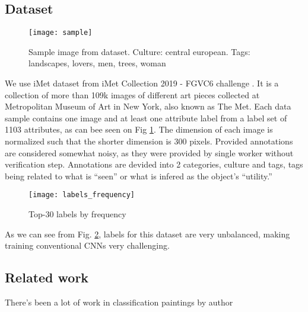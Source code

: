 \documentclass[10pt,twocolumn,letterpaper]{article}
\begin{document}
\subsection{Dataset}
\begin{figure}[h!]
\begin{center}
    \texttt{[image: sample]}
\end{center}
  \caption{Sample image from dataset. Culture: central european. Tags: landscapes, lovers, men, trees, woman}
  \label{fig:imet_sample}
\end{figure}
We use iMet dataset from iMet Collection 2019 - FGVC6 challenge \cite{imet}. It is a collection of more than 109k images of different art pieces collected at Metropolitan Museum of Art in New York, also known as The Met.
Each data sample contains one image and at least one attribute label from a label set of 1103 attributes, as can bee seen on Fig \ref{fig:imet_sample}. The dimension of each image is normalized such that the shorter dimension is 300 pixels. Provided annotations are considered somewhat noisy, as they were provided by single worker without verification step. Annotations are devided into 2 categories, culture and tags, tags being related to what is “seen” or what is infered as the object’s “utility.”	\\

\begin{figure}[h!]
  \texttt{[image: labels\_frequency]}
  \caption{Top-30 labels by frequency}
  \label{fig:top30}
\end{figure}
As we can see from Fig. \ref{fig:top30}, labels for this dataset are very unbalanced, making training conventional CNNs very challenging.


\subsection{Related work}

There's been a lot of work in classification paintings by author 



\end{document}
